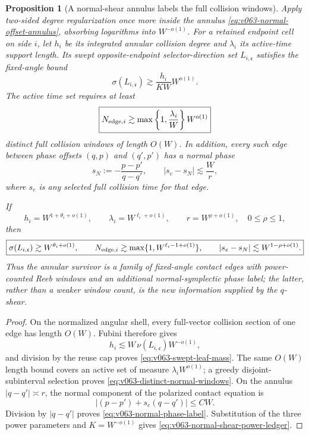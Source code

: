\documentclass[10pt]{article}
\newtheorem{proposition}[theorem]{Proposition}
\begin{document}
\begin{proposition}[A normal-shear annulus labels the full collision windows]
\label{prop:v063-normal-shear-output}
Apply two-sided degree regularization once more inside the annulus
\eqref{eq:v063-normal-offset-annulus}, absorbing logarithms into \(W^{-o(1)}\).  For a retained
endpoint cell on side \(i\), let \(h_i\) be its integrated annular collision degree and
\(\lambda_i\) its active-time support length.  Its swept opposite-endpoint selector-direction set
\(L_{i,\mathfrak c}\) satisfies the fixed-angle bound
\begin{equation}
\label{eq:v063-swept-leaf-mass}
\boxed{
\sigma(L_{i,\mathfrak c})
\gtrsim
\frac{h_i}{K W}
W^{o(1)}.
}
\end{equation}
The active time set requires at least
\begin{equation}
\label{eq:v063-distinct-normal-windows}
\boxed{
N_{{\rm edge},i}
\gtrsim
\max\left\{1,\frac{\lambda_i}{W}\right\}
W^{o(1)}
}
\end{equation}
distinct full collision windows of length \(O(W)\).  In addition, every such edge between phase
offsets \((q,p)\) and \((q',p')\) has a normal phase
\begin{equation}
\label{eq:v063-normal-phase-label}
\boxed{
s_N
:=
-\frac{p-p'}{q-q'},
\qquad
|s_e-s_N|
\lesssim
\frac Wr,
}
\end{equation}
where \(s_e\) is any selected full collision time for that edge.

If
\[
h_i=W^{1+\theta_i+o(1)},
\qquad
\lambda_i=W^{\ell_i+o(1)},
\qquad
r=W^{\rho+o(1)},
\quad 0\le\rho\le1,
\]
then
\begin{equation}
\label{eq:v063-normal-shear-power-ledger}
\boxed{
\sigma(L_{i,\mathfrak c})
\gtrsim
W^{\theta_i+o(1)},
\qquad
N_{{\rm edge},i}
\gtrsim
\max\{1,W^{\ell_i-1+o(1)}\},
\qquad
|s_e-s_N|
\lesssim
W^{1-\rho+o(1)}.
}
\end{equation}
Thus the annular survivor is a family of fixed-angle contact edges with power-counted Reeb windows
and an additional normal-symplectic phase label; the latter, rather than a weaker window count, is
the new information supplied by the \(q\)-shear.
\end{proposition}

\begin{proof}
On the normalized angular shell, every full-vector collision section of one edge has length
\(O(W)\).  Fubini therefore gives
\[
h_i
\lesssim
W\,\nu(L_{i,\mathfrak c})W^{-o(1)},
\]
and division by the reuse cap proves \eqref{eq:v063-swept-leaf-mass}.  The same \(O(W)\) length bound
covers an active set of measure \(\lambda_iW^{o(1)}\); a greedy disjoint-subinterval selection proves
\eqref{eq:v063-distinct-normal-windows}.  On the annulus \(|q-q'|\asymp r\), the normal component of
the polarized contact equation is
\[
|(p-p')+s_e(q-q')|\le CW.
\]
Division by \(|q-q'|\) proves \eqref{eq:v063-normal-phase-label}.  Substitution of the three power
parameters and \(K=W^{-o(1)}\) gives \eqref{eq:v063-normal-shear-power-ledger}.
\end{proof}
\end{document}
